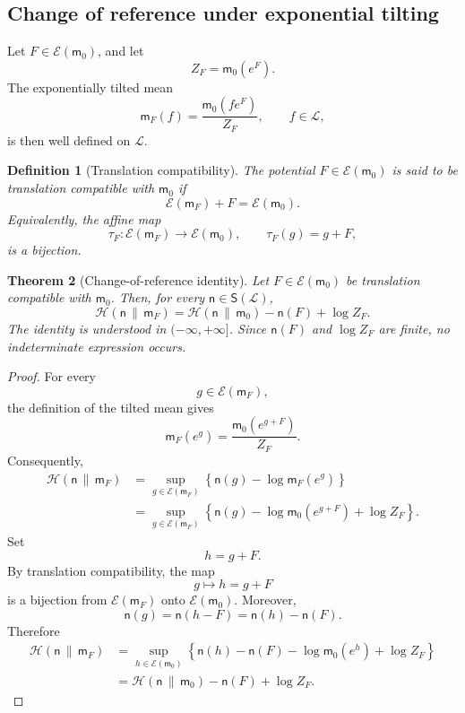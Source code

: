 \documentclass[11pt,reqno]{amsart}
\newtheorem{Theorem}{Theorem}[section]
\newtheorem{Definition}[Theorem]{Definition}
\begin{document}
\subsection{Change of reference under exponential tilting}
\label{subsec:change-reference}

Let $F\in\mathcal E(\mathsf m_0)$, and let
\[
Z_F=\mathsf m_0(e^F).
\]
The exponentially tilted mean
\[
\mathsf m_F(f)
=
\frac{\mathsf m_0(fe^F)}{Z_F},
\qquad
f\in\mathcal L,
\]
is then well defined on $\mathcal L$.

\begin{Definition}[Translation compatibility]
\label{def:translation-compatibility}
The potential $F\in\mathcal E(\mathsf m_0)$ is said to be
\emph{translation compatible with $\mathsf m_0$} if
\[
\mathcal E(\mathsf m_F)+F
=
\mathcal E(\mathsf m_0).
\]
Equivalently, the affine map
\[
\tau_F\colon
\mathcal E(\mathsf m_F)
\longrightarrow
\mathcal E(\mathsf m_0),
\qquad
\tau_F(g)=g+F,
\]
is a bijection.
\end{Definition}

\begin{Theorem}[Change-of-reference identity]
\label{thm:change-reference}
Let $F\in\mathcal E(\mathsf m_0)$ be translation compatible with
$\mathsf m_0$. Then, for every
$\mathsf n\in\mathsf S(\mathcal L)$,
\[
\boxed{
\mathcal H(\mathsf n\,\|\,\mathsf m_F)
=
\mathcal H(\mathsf n\,\|\,\mathsf m_0)
-
\mathsf n(F)
+
\log Z_F.
}
\]
The identity is understood in $(-\infty,+\infty]$. Since
$\mathsf n(F)$ and $\log Z_F$ are finite, no indeterminate expression
occurs.
\end{Theorem}

\begin{proof}
For every
\[
g\in\mathcal E(\mathsf m_F),
\]
the definition of the tilted mean gives
\[
\mathsf m_F(e^g)
=
\frac{
\mathsf m_0(e^{g+F})
}{
Z_F
}.
\]
Consequently,
\begin{align*}
\mathcal H(\mathsf n\,\|\,\mathsf m_F)
&=
\sup_{g\in\mathcal E(\mathsf m_F)}
\left\{
\mathsf n(g)-\log\mathsf m_F(e^g)
\right\}
\\
&=
\sup_{g\in\mathcal E(\mathsf m_F)}
\left\{
\mathsf n(g)
-
\log\mathsf m_0(e^{g+F})
+
\log Z_F
\right\}.
\end{align*}
Set
\[
h=g+F.
\]
By translation compatibility, the map
\[
g\longmapsto h=g+F
\]
is a bijection from $\mathcal E(\mathsf m_F)$ onto
$\mathcal E(\mathsf m_0)$. Moreover,
\[
\mathsf n(g)
=
\mathsf n(h-F)
=
\mathsf n(h)-\mathsf n(F).
\]
Therefore
\begin{align*}
\mathcal H(\mathsf n\,\|\,\mathsf m_F)
&=
\sup_{h\in\mathcal E(\mathsf m_0)}
\left\{
\mathsf n(h)
-
\mathsf n(F)
-
\log\mathsf m_0(e^h)
+
\log Z_F
\right\}
\\
&=
\mathcal H(\mathsf n\,\|\,\mathsf m_0)
-
\mathsf n(F)
+
\log Z_F.
\end{align*}
\end{proof}
\end{document}
